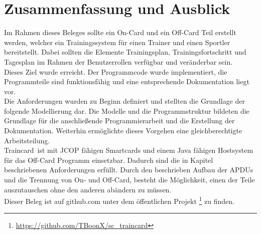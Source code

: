 \clearpage
\section{Zusammenfassung und Ausblick}
\label{sec:4}

Im Rahmen dieses Beleges sollte ein On-Card und ein Off-Card Teil erstellt werden, welcher ein Trainingssystem für einen Trainer und einen Sportler bereitstellt.
Dabei sollten die Elemente Trainingsplan, Trainingsfortschritt und Tagesplan im Rahmen der Benutzerrollen verfügbar und veränderbar sein.
\\
Dieses Ziel wurde erreicht. Der Programmcode wurde implementiert, die Programmteile sind funktionsfähig und eine entsprechende Dokumentation liegt vor.
\\
Die Anforderungen wurden zu Beginn definiert und stellten die Grundlage der folgende Modellierung dar.
Die Modelle und die Programmstruktur bildeten die Grundlage für die anschließende Programmierarbeit und die Erstellung der Dokumentation.
Weiterhin ermöglichte dieses Vorgehen eine gleichberechtigte Arbeitsteilung.
\\

\glqq Traincard\grqq \ ist mit JCOP fähigen Smartcards und einem Java fähigen Hostsystem für das Off-Card Programm einsetzbar.
Dadurch sind die in Kapitel  beschriebenen Anforderungen erfüllt.
Durch den beschrieben Aufbau der APDUs und die Trennung von On- und Off-Card, besteht die Möglichkeit, einen der Teile auszutauschen ohne den anderen abändern zu müssen.
\\

Dieser Beleg ist auf github.com unter dem öffentlichen Projekt \footnote{\url{https://github.com/TBoonX/sc_traincard}} zu finden.